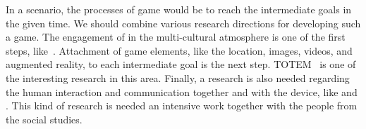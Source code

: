 \documentclass[conference]{IEEEtran}
\begin{document}
In a scenario, the processes of game would be 
to reach the intermediate goals in the given time.
We should combine various research directions for developing such a game.
The engagement of in the multi-cultural atmosphere is one of the first steps,
like~\cite{rexplorer, scal-loc-g}. 
Attachment of game elements, like the location, images, videos, and augmented reality, to each intermediate goal is the next step.
TOTEM~\cite{totem} is one of the interesting research in this area.
Finally, a research is also needed regarding the human interaction and communication
together and with the device, like \cite{behavior} and \cite{facial-vocal}.
This kind of research is needed an intensive work together with the people 
from the social studies.



\end{document}
